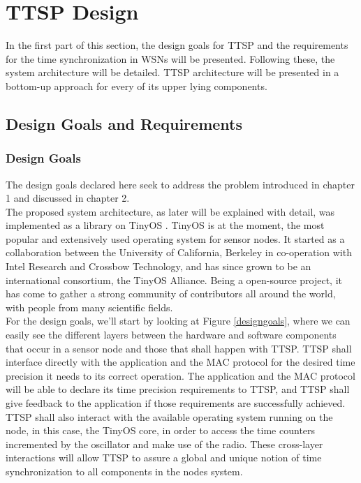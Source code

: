 \chapter{TTSP Design}

In the first part of this section, the design goals for TTSP and the requirements for the time synchronization in WSNs will be presented. Following these, the system architecture will be detailed. TTSP architecture will be presented in a bottom-up approach for every of its upper lying components.  

\setcounter{secnumdepth}{2}
\section{Design Goals and Requirements}
\subsection{Design Goals}
The design goals declared here seek to address the problem introduced in chapter 1 and discussed in chapter 2.\\
The proposed system architecture, as later will be explained with detail, was implemented as a library on TinyOS \cite{conf/mdm/Levis06}. TinyOS is at the moment,  the most popular and extensively used operating system for sensor nodes. It started as a collaboration between the University of California, Berkeley in co-operation with Intel Research and Crossbow Technology, and has since grown to be an international consortium, the TinyOS Alliance. Being a open-source project, it has come to gather a strong community of contributors all around the world, with people from many scientific fields.\\
For the design goals, we'll start by looking at Figure \ref{designgoals}, where we can easily see the different layers between the hardware and software components that occur in a sensor node and those that shall happen with TTSP. TTSP shall interface directly with the application and the MAC protocol for the desired time precision it needs to its correct operation. The application and the MAC protocol will be able to declare its time precision requirements to TTSP, and TTSP shall give feedback to the application if those requirements are successfully achieved. TTSP shall also interact with the available operating system running on the node, in this case, the TinyOS core, in order to access the time counters incremented by the oscillator and make use of the radio. These cross-layer interactions will allow TTSP to assure a global and unique notion of time synchronization to all components in the nodes system.

